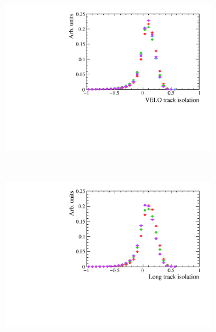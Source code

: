 \begin{figure}
 \begin{subfigure}[b]{0.48\textwidth}
        \includegraphics[width=\textwidth]{./Figs/Selection/signal_iso_velo.pdf}
        \caption{ }
        \label{fig:BDTsig}
    \end{subfigure}
    ~ %
    \begin{subfigure}[b]{0.48\textwidth}
       \includegraphics[width=\textwidth]{./Figs/Selection/signal_long_iso.pdf}
        \caption{ }
        \label{fig:BDTbkg}
    \end{subfigure}





\end{figure}
